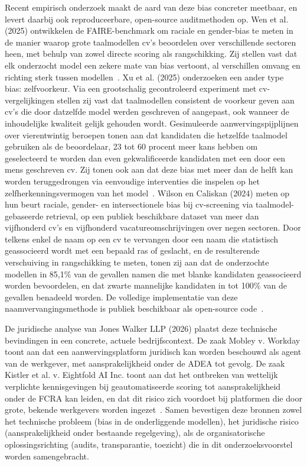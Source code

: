 \documentclass{hogent-article}
\begin{document}
Recent empirisch onderzoek maakt de aard van deze bias concreter meetbaar,
en levert daarbij ook reproduceerbare, open-source auditmethoden op. Wen et
al. (2025) ontwikkelen de FAIRE-benchmark om raciale en gender-bias te meten
in de manier waarop grote taalmodellen cv's beoordelen over verschillende
sectoren heen, met behulp van zowel directe scoring als rangschikking. Zij
stellen vast dat elk onderzocht model een zekere mate van bias vertoont, al
verschillen omvang en richting sterk tussen modellen~\autocite{Wen2025}. Xu
et al. (2025) onderzoeken een ander type bias: zelfvoorkeur. Via een
grootschalig gecontroleerd experiment met cv-vergelijkingen stellen zij vast
dat taalmodellen consistent de voorkeur geven aan cv's die door datzelfde
model werden geschreven of aangepast, ook wanneer de inhoudelijke kwaliteit
gelijk gehouden wordt. Gesimuleerde aanwervingspijplijnen over
vierentwintig beroepen tonen aan dat kandidaten die hetzelfde taalmodel
gebruiken als de beoordelaar, 23 tot 60 procent meer kans hebben om
geselecteerd te worden dan even gekwalificeerde kandidaten met een door een
mens geschreven cv. Zij tonen ook aan dat deze bias met meer dan de helft
kan worden teruggedrongen via eenvoudige interventies die inspelen op het
zelfherkenningsvermogen van het model~\autocite{Xu2025}. Wilson en Caliskan
(2024) meten op hun beurt raciale, gender- en intersectionele bias bij
cv-screening via taalmodel-gebaseerde retrieval, op een publiek
beschikbare dataset van meer dan vijfhonderd cv's en vijfhonderd
vacatureomschrijvingen over negen sectoren. Door telkens enkel de naam op
een cv te vervangen door een naam die statistisch geassocieerd wordt met
een bepaald ras of geslacht, en de resulterende verschuiving in
rangschikking te meten, tonen zij aan dat de onderzochte modellen in 85,1\%
van de gevallen namen die met blanke kandidaten geassocieerd worden
bevoordelen, en dat zwarte mannelijke kandidaten in tot 100\% van de
gevallen benadeeld worden. De volledige implementatie van deze
naamvervangingsmethode is publiek beschikbaar als open-source
code~\autocite{Wilson2024}.

De juridische analyse van Jones Walker LLP (2026) plaatst deze technische
bevindingen in een concrete, actuele bedrijfscontext. De zaak Mobley
v. Workday toont aan dat een aanwervingsplatform juridisch kan worden
beschouwd als agent van de werkgever, met aansprakelijkheid onder de ADEA
tot gevolg. De zaak Kistler et al. v. Eightfold AI Inc. toont aan dat het
ontbreken van wettelijk verplichte kennisgevingen bij geautomatiseerde
scoring tot aansprakelijkheid onder de FCRA kan leiden, en dat dit risico
zich voordoet bij platformen die door grote, bekende werkgevers worden
ingezet~\autocite{JonesWalker2026}. Samen bevestigen deze bronnen zowel het
technische probleem (bias in de onderliggende modellen), het juridische
risico (aansprakelijkheid onder bestaande regelgeving), als de
organisatorische oplossingsrichting (audits, transparantie, toezicht) die in
dit onderzoeksvoorstel worden samengebracht.
\end{document}
